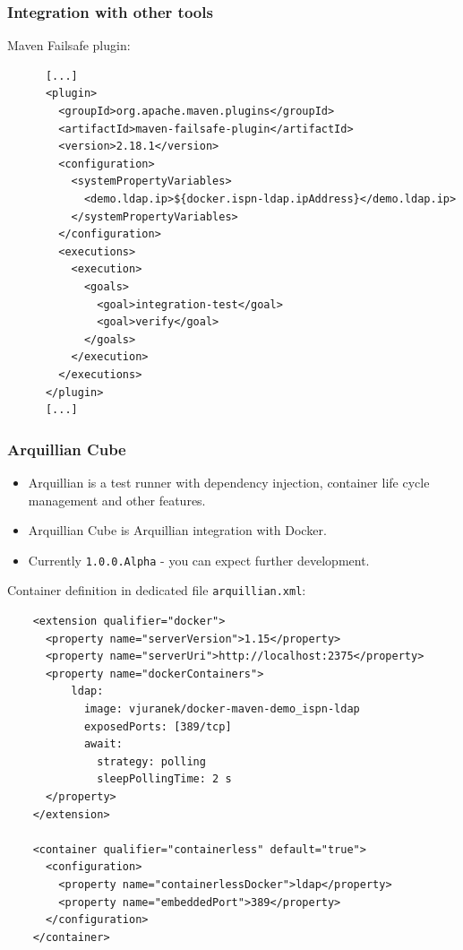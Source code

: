 \documentclass[10pt,utf8]{beamer}
\begin{document}
\begin{frame}[fragile]
	\frametitle{Integration with other tools}
	Maven Failsafe plugin:
		\scriptsize{
		\lstset{language=XML}
		\begin{lstlisting}
      [...]
      <plugin>
        <groupId>org.apache.maven.plugins</groupId>
        <artifactId>maven-failsafe-plugin</artifactId>
        <version>2.18.1</version>
        <configuration>
          <systemPropertyVariables>
            <demo.ldap.ip>${docker.ispn-ldap.ipAddress}</demo.ldap.ip>
          </systemPropertyVariables>
        </configuration>
        <executions>
          <execution>
            <goals>
              <goal>integration-test</goal>
              <goal>verify</goal>
            </goals>
          </execution>
        </executions>
      </plugin>
      [...]
		\end{lstlisting}
	}
\end{frame}

\begin{frame}[fragile]
	\frametitle{Arquillian Cube}
	\begin{itemize}
		\item Arquillian is a test runner with dependency injection, container life cycle management and other features.
		\item Arquillian Cube is Arquillian integration with Docker.
		\item Currently \texttt{1.0.0.Alpha} - you can expect further development.
	\end{itemize}
	Container definition in dedicated file \texttt{arquillian.xml}:
	\scriptsize{
		\begin{verbatim}
    <extension qualifier="docker">
      <property name="serverVersion">1.15</property>
      <property name="serverUri">http://localhost:2375</property>
      <property name="dockerContainers">
          ldap:
            image: vjuranek/docker-maven-demo_ispn-ldap
            exposedPorts: [389/tcp]
            await:
              strategy: polling
              sleepPollingTime: 2 s
      </property>
    </extension>

    <container qualifier="containerless" default="true">
      <configuration>
        <property name="containerlessDocker">ldap</property>
        <property name="embeddedPort">389</property>
      </configuration>
    </container>
		\end{verbatim}
	}
\end{frame}
\end{document}
